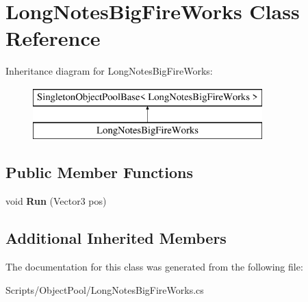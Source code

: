 \hypertarget{class_long_notes_big_fire_works}{}\section{Long\+Notes\+Big\+Fire\+Works Class Reference}
\label{class_long_notes_big_fire_works}
Inheritance diagram for Long\+Notes\+Big\+Fire\+Works\+:\begin{figure}[H]
\begin{center}
\leavevmode
\includegraphics[height=2.000000cm]{class_long_notes_big_fire_works}
\end{center}
\end{figure}
\subsection*{Public Member Functions}
\begin{DoxyCompactItemize}
\item 
void {\bfseries Run} (Vector3 pos)\hypertarget{class_long_notes_big_fire_works_adb1c632ae5247e45829a7947626995e1}{}\label{class_long_notes_big_fire_works_adb1c632ae5247e45829a7947626995e1}

\end{DoxyCompactItemize}
\subsection*{Additional Inherited Members}


The documentation for this class was generated from the following file\+:\begin{DoxyCompactItemize}
\item 
Scripts/\+Object\+Pool/Long\+Notes\+Big\+Fire\+Works.\+cs\end{DoxyCompactItemize}

